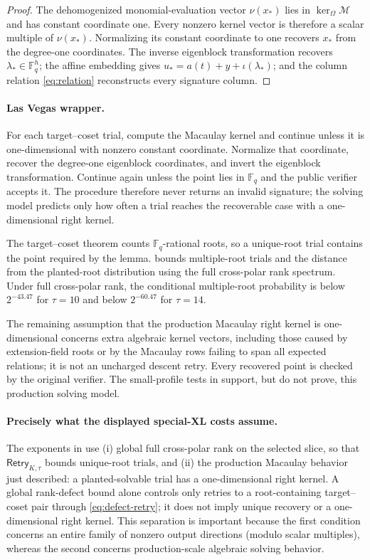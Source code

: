 \documentclass[11pt]{article}
\newcommand{\F}{\mathbb F}
\begin{document}
\begin{proof}
The dehomogenized monomial-evaluation vector $\nu(x_*)$ lies in
$\ker_\Omega\mathcal M$ and has constant coordinate one.  Every nonzero
kernel vector is therefore a scalar multiple of $\nu(x_*)$.  Normalizing its
constant coordinate to one recovers $x_*$ from the degree-one coordinates.  The
inverse eigenblock transformation recovers $\lambda_*\in\F_q^h$; the affine
embedding gives $u_*=a(t)+y+\iota(\lambda_*)$; and the column relation
\eqref{eq:relation} reconstructs every signature column.
\end{proof}

\paragraph{Las Vegas wrapper.}
For each target--coset trial, compute the Macaulay kernel and continue unless
it is one-dimensional with nonzero constant coordinate.  Normalize that
coordinate, recover the degree-one eigenblock coordinates, and invert the
eigenblock transformation.  Continue again unless the point lies in $\F_q$
and the public verifier accepts it.  The procedure therefore never returns an
invalid signature; the solving model predicts only how often a trial reaches
the recoverable case with a one-dimensional right kernel.


The target--coset theorem counts $\F_q$-rational roots, so a unique-root
trial contains the point required by the lemma.  
bounds multiple-root trials and the distance from the planted-root
distribution using the full cross-polar rank spectrum.  Under full
cross-polar rank, the conditional multiple-root probability is below
$2^{-43.47}$ for $\tau=10$ and below $2^{-60.47}$ for $\tau=14$.

The remaining assumption that the production Macaulay right kernel is
one-dimensional concerns extra algebraic kernel vectors, including those
caused by extension-field roots or by the Macaulay rows failing to span all
expected relations; it is not an uncharged descent retry.  Every recovered point is checked by the original
verifier.  The small-profile tests in  support, but do not
prove, this production solving model.

\paragraph{Precisely what the displayed special-XL costs assume.}
The exponents in  use (i) global full cross-polar rank on
the selected slice, so that $\mathsf{Retry}_{K,\tau}$ bounds unique-root trials, and (ii) the
production Macaulay behavior just described: a planted-solvable trial has a
one-dimensional right kernel.  A global rank-defect bound alone controls only
retries to a root-containing target--coset pair through
\eqref{eq:defect-retry}; it does not imply
unique recovery or a one-dimensional right kernel.  This
separation is important because the first condition concerns an entire
family of nonzero output directions (modulo scalar multiples), whereas the second concerns production-scale algebraic
solving behavior.
\end{document}
